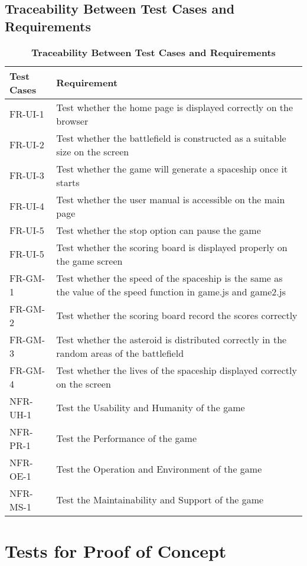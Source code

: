 \documentclass[12pt, titlepage]{article}
\begin{document}
\newpage

\subsection{Traceability Between Test Cases and Requirements}
\begin{table}[hbp]
\caption{\textbf{Traceability Between Test Cases and Requirements}} \label{Table}

\begin{tabularx}{\textwidth}{p{3cm}X}
\toprule
\textbf{Test Cases} & \textbf{Requirement} \\
\midrule
FR-UI-1 & Test whether the home page is displayed correctly on the browser\\
FR-UI-2 & Test whether the battlefield is constructed as a suitable size on the screen\\
FR-UI-3 & Test whether the game will generate a spaceship once it starts\\
FR-UI-4 & Test whether the user manual is accessible on the main page\\
FR-UI-5 & Test whether the stop option can pause the game\\
FR-UI-5 & Test whether the scoring board is displayed properly on the game screen\\
FR-GM-1 & Test whether the speed of the spaceship is the same as the value of the speed function in game.js and game2.js\\
FR-GM-2 & Test whether the scoring board record the scores correctly\\
FR-GM-3 & Test whether the asteroid is distributed correctly in the random areas of the battlefield\\
FR-GM-4 & Test whether the lives of the spaceship displayed correctly on the screen\\
NFR-UH-1 & Test the Usability and Humanity of the game\\
NFR-PR-1 & Test the Performance of the game\\
NFR-OE-1 & Test the Operation and Environment of the game\\
NFR-MS-1 & Test the Maintainability and Support of the game\\
\bottomrule
\end{tabularx}
\end{table}




\section{Tests for Proof of Concept}
\end{document}
